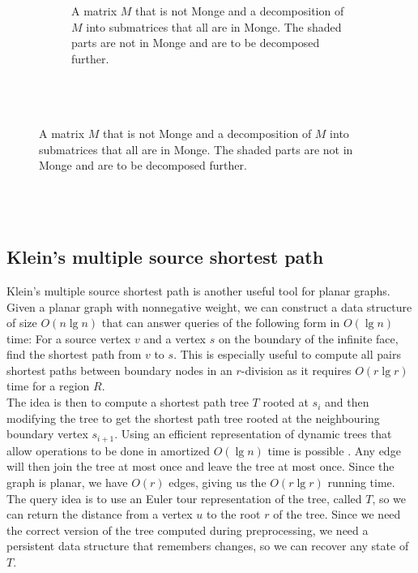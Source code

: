 \begin{figure}
\begin{subfigure}[b]{0.45\textwidth}
    \caption{A matrix $M$ that is not Monge and a decomposition of $M$ into submatrices
    that all are in Monge. The shaded parts are not in Monge and are to be decomposed
  further. \\ \\ \\ \\} 
    \label{mongematrix}
  \end{subfigure}
\end{figure}

\subsection{Klein's multiple source shortest path}
Klein's multiple source shortest path \cite{klein2005multiple} is another useful tool for planar
graphs. Given a planar graph with nonnegative weight, we can construct a data structure
of size $O(n \lg n)$ that can answer queries of the following form in $O(\lg n)$ time:
For a source vertex $v$ and a vertex $s$ on the boundary of the infinite face, find the
shortest path from $v$ to $s$. This is especially useful to compute all pairs shortest paths between boundary
nodes in an $r$-division as it requires $O(r\lg r)$ time for a region $R$. \\
The idea is then to compute a shortest path tree $T$ rooted at
$s_i$ and then modifying the tree to get the shortest path tree rooted at the
neighbouring boundary vertex $s_{i+1}$. Using an efficient representation of dynamic
trees that allow operations to be done in amortized $O(\lg n)$ time is possible
\cite{tarjan2005self}\cite{henzinger1999randomized}. Any edge will then join the tree at
most once and leave the tree at most once. Since the graph is planar, we have $O(r)$ edges,
giving us the $O(r\lg r)$ running time. \\
The query idea is to use an Euler tour representation of the tree, called $T$, so we can
return the distance from a vertex $u$ to the root $r$ of the tree. Since we need the
correct version of the tree computed during preprocessing, we need a persistent data
structure that remembers changes, so we can recover any state of $T$.

